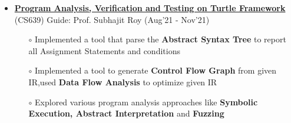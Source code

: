 \documentclass[10.8pt, a4paper]{extarticle}
\begin{document}
\begin{itemize}

 \item \href{https://github.com/jeetsarangi/Automated-Program-Analysis-Verification-and-Testing} {\textbf{Program Analysis, Verification and Testing on Turtle Framework}} (CS639) Guide: Prof.  Subhajit Roy  \hfill(Aug'21 - Nov'21)
	\\[-0.6cm]
	\begin{itemize}
	    \item[$\circ$] Implemented a tool that parse the \textbf{Abstract Syntax Tree} to report all Assignment Statements and conditions\\[-0.6cm]
	    
	    \item[$\circ$] Implemented a tool to generate \textbf{Control Flow Graph} from given IR,used \textbf{Data Flow Analysis} to optimize given IR\\[-0.6cm]
	    
	    
	    
	    \item[$\circ$] Explored
	    various program analysis approaches like \textbf{Symbolic Execution, Abstract Interpretation} and \textbf{Fuzzing} \\[-0.6cm]
	    
	    
	\end{itemize}



\end{itemize}
\end{document}
